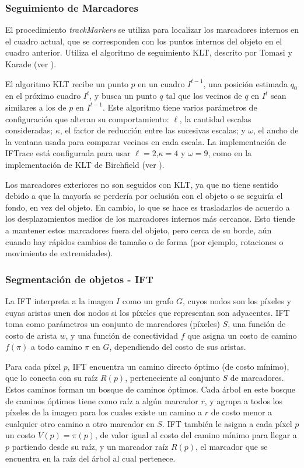 \documentclass[a4paper,10pt]{article}
\begin{document}
\subsubsection{Seguimiento de Marcadores}

El procedimiento \textit{trackMarkers} se utiliza para localizar los marcadores
internos en el cuadro actual, que se corresponden con los puntos internos del objeto
en el cuadro anterior. Utiliza el algoritmo de seguimiento KLT, descrito por Tomasi y
Karade (ver \cite{Tomasi91detectionand}).

El algoritmo KLT recibe un punto $p$ en un cuadro $I^{t-1}$, una posición estimada
$q_{0}$ en el próximo cuadro $I^{t}$, y busca un punto $q$ tal que los vecinos
de $q$ en $I^{t}$ sean similares a los de $p$ en $I^{t-1}$. Este algoritmo tiene
varios parámetros de configuración que alteran su comportamiento: $\ell$, la cantidad
escalas consideradas; $\kappa$, el factor de reducción entre las sucesivas escalas; y
$\omega$, el ancho de la ventana usada para comparar vecinos en cada escala.
La implementación de IFTrace está configurada para usar $\ell=2$,$\kappa=4$ y
$\omega=9$, como en la implementación de KLT de Birchfield (ver \cite{Birchfield-KLT-implementation}).

Los marcadores exteriores no son seguidos con KLT, ya que no tiene sentido debido
a que la mayoría se perdería por oclusión con el objeto o se seguiría el fondo, en
vez del objeto. En cambio, lo que se hace es trasladarlos de acuerdo a los
desplazamientos medios de los marcadores internos más cercanos. Esto tiende
a mantener estos marcadores fuera del objeto, pero cerca de su borde, aún cuando
hay rápidos cambios de tamaño o de forma (por ejemplo, rotaciones o movimiento de extremidades).

\subsubsection{Segmentación de objetos - IFT}

La IFT interpreta a la imagen $I$ como un grafo $G$, cuyos nodos son los
píxeles y cuyas aristas unen dos nodos si los píxeles que representan son
adyacentes. IFT toma como parámetros un conjunto de marcadores (píxeles) $S$,
una función de costo de arista $w$, y una función de conectividad $f$ que
asigna un costo de camino $f(\pi)$ a todo camino $\pi$ en $G$, dependiendo del
costo de sus aristas.

Para cada píxel $p$, IFT encuentra un camino directo óptimo (de costo mínimo),
que lo conecta con su raíz $R(p)$, perteneciente al conjunto $S$ de marcadores.
Estos caminos forman un bosque de caminos óptimos. Cada árbol en este bosque de
caminos óptimos tiene como raíz a algún marcador $r$, y agrupa a todos los
píxeles de la imagen para los cuales existe un camino a $r$ de costo menor
a cualquier otro camino a otro marcador en $S$. IFT también le asigna a cada
píxel $p$ un costo $V(p) = \pi(p)$, de valor igual al costo del camino mínimo
para llegar a $p$ partiendo desde su raíz, y un marcador raíz $R(p)$, el
marcador que se encuentra en la raíz del árbol al cual pertenece.
\end{document}

